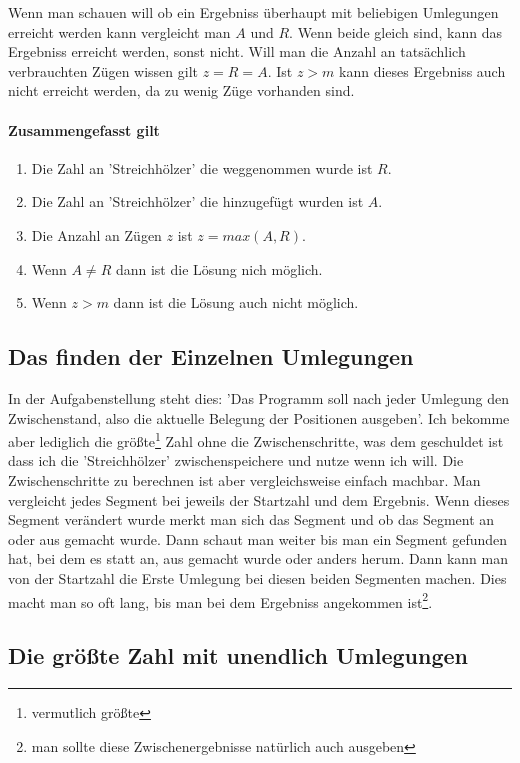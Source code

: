 \documentclass[a4paper,10pt,ngerman]{scrartcl}
\begin{document}
Wenn man schauen will ob ein Ergebniss überhaupt mit beliebigen Umlegungen erreicht werden kann vergleicht man $A$ und $R$. Wenn beide gleich sind, kann das Ergebniss erreicht werden, sonst nicht. Will man die Anzahl an tatsächlich verbrauchten Zügen wissen gilt $z = R = A$. Ist $z > m$ kann dieses Ergebniss auch nicht erreicht werden, da zu wenig Züge vorhanden sind.

\paragraph{Zusammengefasst gilt}

\begin{enumerate}
  \item Die Zahl an 'Streichhölzer' die weggenommen wurde ist $R$.
  \item Die Zahl an 'Streichhölzer' die hinzugefügt wurden ist $A$.
  \item Die Anzahl an Zügen $z$ ist $z = max(A, R)$.
  \item Wenn $A \neq R$ dann ist die Lösung nich möglich.
  \item Wenn $z > m$ dann ist die Lösung auch nicht möglich.
\end{enumerate}

\subsection{Das finden der Einzelnen Umlegungen}

In der Aufgabenstellung steht dies: 'Das Programm soll nach jeder Umlegung den Zwischenstand, also die aktuelle Belegung
der Positionen ausgeben'. Ich bekomme aber lediglich die größte\footnote{vermutlich größte} Zahl ohne die Zwischenschritte, was dem geschuldet ist dass ich die 'Streichhölzer' zwischenspeichere und nutze wenn ich will. Die Zwischenschritte zu berechnen ist aber vergleichsweise einfach machbar. Man vergleicht jedes Segment bei jeweils der Startzahl und dem Ergebnis. Wenn dieses Segment verändert wurde merkt man sich das Segment und ob das Segment an oder aus gemacht wurde. Dann schaut man weiter bis man ein Segment gefunden hat, bei dem es statt an, aus gemacht wurde oder anders herum. Dann kann man von der Startzahl die Erste Umlegung bei diesen beiden Segmenten machen. Dies macht man so oft lang, bis man bei dem Ergebniss angekommen ist\footnote{man sollte diese Zwischenergebnisse natürlich auch ausgeben}.

\subsection{Die größte Zahl mit unendlich Umlegungen}  
\end{document}
